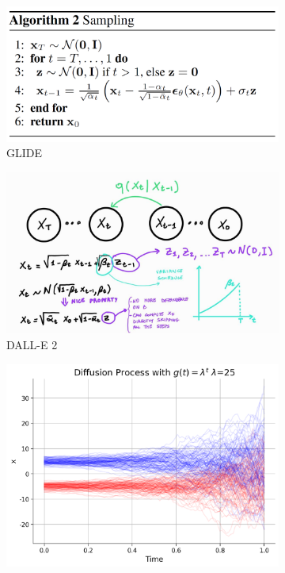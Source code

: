 \begin{itemize}
    \begin{figure}[H]
        \centering
        \begin{subfigure}[b]{0.32\textwidth}
            \centering
            \includegraphics[width=\textwidth]{figures/D4.png}
            \caption{GLIDE}
            \label{fig:glide_example}
        \end{subfigure}
        \hfill
        \begin{subfigure}[b]{0.32\textwidth}
            \centering
            \includegraphics[width=\textwidth]{figures/D5.png}
            \caption{DALL-E 2}
            \label{fig:dalle2_example}
        \end{subfigure}
        \hfill
        \begin{subfigure}[b]{0.32\textwidth}
            \centering
            \includegraphics[width=\textwidth]{figures/D6.png}

\end{subfigure}
\end{figure}
\end{itemize}
